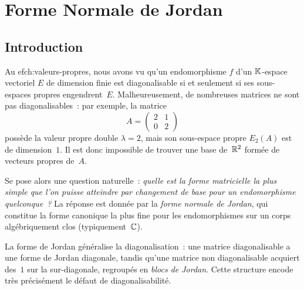 
\chapter{Forme Normale de Jordan}\label{ch:jordan}

\section*{Introduction}

Au 
ef{ch:valeurs-propres}, nous avons vu qu'un endomorphisme $f$ d'un
${\mathbb{K}}$-espace vectoriel $E$ de dimension finie est diagonalisable si et
seulement si ses sous-espaces propres engendrent~$E$. Malheureusement,
de nombreuses matrices ne sont pas diagonalisables~: par exemple, la
matrice
\[
  A=\begin{pmatrix}2&1\\0&2\end{pmatrix}
\]
possède la valeur propre double $\lambda=2$, mais son sous-espace propre
$E_2(A)$ est de dimension~$1$. Il est donc impossible de trouver une base
de~${\mathbb{R}}^2$ formée de vecteurs propres de~$A$.

\medskip

Se pose alors une question naturelle~: \emph{quelle est la forme
matricielle la plus simple que l'on puisse atteindre par changement de
base pour un endomorphisme quelconque~?} La réponse est donnée par la
\emph{forme normale de Jordan}, qui
constitue la forme canonique la plus fine pour les endomorphismes sur un
corps algébriquement clos (typiquement~${\mathbb{C}}$).

\medskip

La forme de Jordan généralise la diagonalisation~:
une matrice diagonalisable a une forme de Jordan diagonale, tandis qu'une
matrice non diagonalisable acquiert des~$1$ sur la sur-diagonale,
regroupés en \emph{blocs de Jordan}. Cette structure encode très
précisément le défaut de diagonalisabilité.

\medskip

